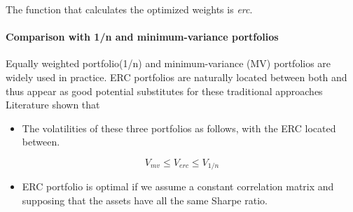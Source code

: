 \documentclass[]{article}
\providecommand{\tightlist}{%
  \setlength{\itemsep}{0pt}\setlength{\parskip}{0pt}}
\let\oldparagraph\paragraph
\renewcommand{\paragraph}[1]{\oldparagraph{#1}\mbox{}}
\begin{document}
The function that calculates the optimized weights is \emph{erc}.

\paragraph{Comparison with 1/n and minimum-variance
portfolios}\label{comparison-with-1n-and-minimum-variance-portfolios}

Equally weighted portfolio(1/n) and minimum-variance (MV) portfolios are
widely used in practice. ERC portfolios are naturally located between
both and thus appear as good potential substitutes for these traditional
approaches Literature shown that

\begin{itemize}
\tightlist
\item
  The volatilities of these three portfolios as follows, with the ERC
  located between.
\end{itemize}

\[V_{mv}\le V_{erc}\le V_{1/n}\]

\begin{itemize}
\tightlist
\item
  ERC portfolio is optimal if we assume a constant correlation matrix
  and supposing that the assets have all the same Sharpe ratio.
\end{itemize}
\end{document}
